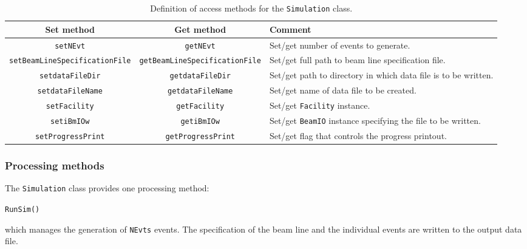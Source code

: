 \begin{sidewaystable}[h]
  \caption{
    Definition of access methods for the \texttt{Simulation}
    class. 
  }
  \label{Tab:Simu:AccessMethods}
  \begin{center}
    \begin{tabular}{|c|c|p{9.5cm}|}
      \hline
      \textbf{Set method} & \textbf{Get method}  & \textbf{Comment}                                                                                       \\
      \hline
      \texttt{setNEvt}                      & \texttt{getNEvt}                      & Set/get number of events to generate.                               \\
      \texttt{setBeamLineSpecificationFile} & \texttt{getBeamLineSpecificationFile} & Set/get full path to beam line specification file.                  \\
      \texttt{setdataFileDir}               & \texttt{getdataFileDir}               & Set/get path to directory in which data file is to be written.      \\
      \texttt{setdataFileName}              & \texttt{getdataFileName}              & Set/get name of data file to be created.                            \\
      \texttt{setFacility}                  & \texttt{getFacility}                  & Set/get \texttt{Facility} instance.                                 \\
      \texttt{setiBmIOw}                    & \texttt{getiBmIOw}                    & Set/get \texttt{BeamIO} instance specifying the file to be written. \\
      \texttt{setProgressPrint}             & \texttt{getProgressPrint}             & Set/get flag that controls the progress printout.                   \\
      \hline
    \end{tabular}
  \end{center}
\end{sidewaystable}

\subsubsection{Processing methods}
\noindent
The \texttt{Simulation} class provides one processing method:
\begin{center}
  \texttt{RunSim()}
\end{center}
which manages the generation of \texttt{NEvts} events.
The specification of the beam line and the individual events are
written to the output data file.

